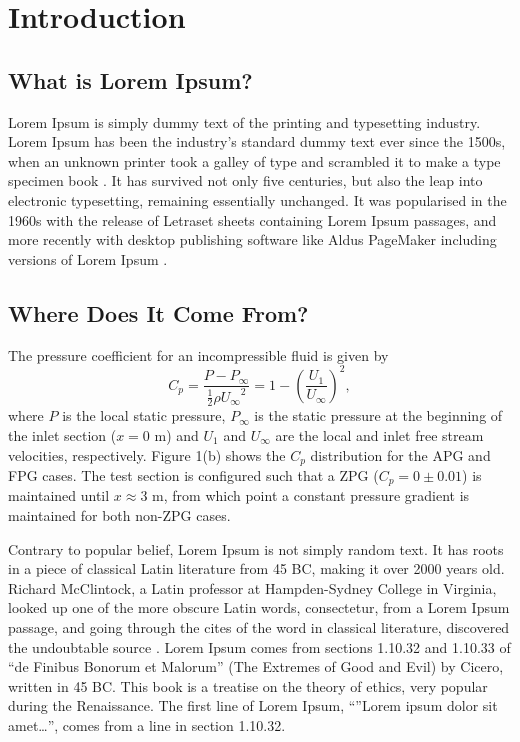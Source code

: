 \chapter{Introduction}
\label{chap:intro}

\section{What is Lorem Ipsum?}
\label{sec:apadia}

Lorem Ipsum is simply dummy text of the printing and typesetting industry. Lorem Ipsum has been the industry's standard dummy text ever since the 1500s, when an unknown printer took a galley of type and scrambled it to make a type specimen book \cite{banerjee:pedersen:2003}. It has survived not only five centuries, but also the leap into electronic typesetting, remaining essentially unchanged. It was popularised in the 1960s with the release of Letraset sheets containing Lorem Ipsum passages, and more recently with desktop publishing software like Aldus PageMaker including versions of Lorem Ipsum \cite{berment:phd:2004}.



\section{Where Does It Come From?}
\label{sec:where}

The pressure coefficient for an incompressible fluid is given by
\begin{equation}
C_p = \frac{P - P_\infty}{\frac{1}{2} \rho {U_\infty}^2}
 = 1 - \left( \frac{U_1}{U_\infty} \right)^2,
\end{equation}
where $P$ is the local static pressure, $P_\infty$ is the static pressure at the beginning of the inlet section ($x = 0$ m) and $U_1$ and $U_\infty$ are the local and inlet free stream velocities, respectively. Figure 1(b) shows the $C_p$ distribution for the APG and FPG cases. The test section is configured such that a ZPG ($C_p = 0 \pm 0.01$) is maintained until $x \approx 3$ m, from which point a constant pressure gradient is maintained for both non-ZPG cases.

Contrary to popular belief, Lorem Ipsum is not simply random text. It has roots in a piece of classical Latin literature from 45 BC, making it over 2000 years old. Richard McClintock, a Latin professor at Hampden-Sydney College in Virginia, looked up one of the more obscure Latin words, consectetur, from a Lorem Ipsum passage, and going through the cites of the word in classical literature, discovered the undoubtable source \cite{azarova:etal:2002,budanitsky:hirst:2006}. Lorem Ipsum comes from sections 1.10.32 and 1.10.33 of ``de Finibus Bonorum et Malorum'' (The Extremes of Good and Evil) by Cicero, written in 45 BC. This book is a treatise on the theory of ethics, very popular during the Renaissance. The first line of Lorem Ipsum, ``''Lorem ipsum dolor sit amet\ldots'', comes from a line in section 1.10.32.

